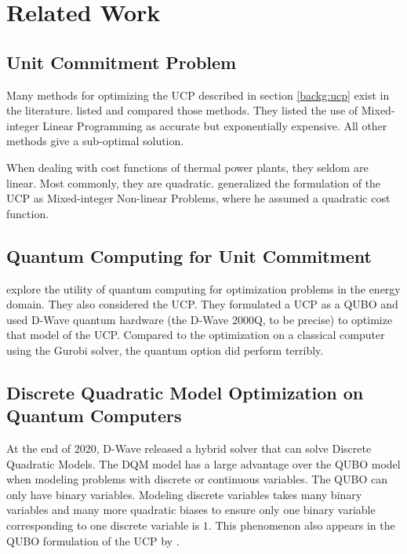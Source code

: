 \section{Related Work}

\subsection{Unit Commitment Problem}

Many methods for optimizing the UCP described in section \ref{backg:ucp} exist in the literature.
\citeauthor{Abujarad2017} listed and compared those methods.
They listed the use of Mixed-integer Linear Programming as accurate but exponentially expensive.
All other methods give a sub-optimal solution.
\cite{Abujarad2017}

When dealing with cost functions of thermal power plants, they seldom are linear.
Most commonly, they are quadratic.
\citeauthor{Baldick1995} generalized the formulation of the UCP as Mixed-integer Non-linear Problems, where he assumed a quadratic cost function.
\cite{Baldick1995}

\subsection{Quantum Computing for Unit Commitment}

\citeauthor{Ajagekar2019} explore the utility of quantum computing for optimization problems in the energy domain.
They also considered the UCP.
They formulated a UCP as a QUBO and used D-Wave quantum hardware (the D-Wave 2000Q, to be precise) to optimize that model of the UCP.
Compared to the optimization on a classical computer using the Gurobi solver, the quantum option did perform terribly.
\cite{Ajagekar2019}

\subsection{Discrete Quadratic Model Optimization on Quantum Computers}

At the end of 2020, D-Wave released a hybrid solver that can solve Discrete Quadratic Models.
\cite{DQMHybrid2020}
The DQM model has a large advantage over the QUBO model when modeling problems with discrete or continuous variables.
The QUBO can only have binary variables.
Modeling discrete variables takes many binary variables and many more quadratic biases to ensure only one binary variable corresponding to one discrete variable is $1$.
This phenomenon also appears in the QUBO formulation of the UCP by \citeauthor{Ajagekar2019}.
\cite{Ajagekar2019}
